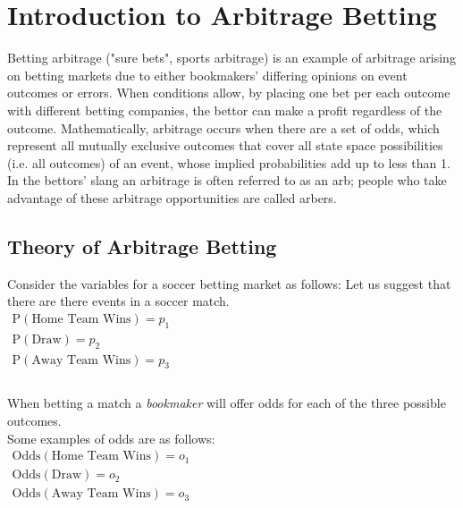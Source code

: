 \section{Introduction to Arbitrage Betting}
Betting arbitrage ("sure bets", sports arbitrage) is an example of arbitrage arising on betting markets due to either bookmakers' differing opinions on event outcomes or errors. When conditions allow, by placing one bet per each outcome with different betting companies, the bettor can make a profit regardless of the outcome. Mathematically, arbitrage occurs when there are a set of odds, which represent all mutually exclusive outcomes that cover all state space possibilities (i.e. all outcomes) of an event, whose implied probabilities add up to less than 1. In the bettors' slang an arbitrage is often referred to as an arb; people who take advantage of these arbitrage opportunities are called arbers.

\subsection{Theory of Arbitrage Betting}

Consider the variables for a soccer betting market as follows:
Let us suggest that there are there events in a soccer match. \\

\begin{math}
\begin{array}{l}
\text{P}(\text{Home Team Wins}) = p_{1} \\
\text{P}(\text{Draw}) = p_{2} \\
\text{P}(\text{Away Team Wins}) = p_{3} \\
\\
\end{array}
\end{math}

When betting a match a \textit{bookmaker} will offer odds for each of the three possible outcomes. \\

Some examples of odds are as follows: \\

\begin{math}
\begin{array}{l}
\text{Odds}(\text{Home Team Wins}) = o_{1} \\
\text{Odds}(\text{Draw}) = o_{2} \\
\text{Odds}(\text{Away Team Wins}) = o_{3} \\
\\
\end{array}
\end{math}

